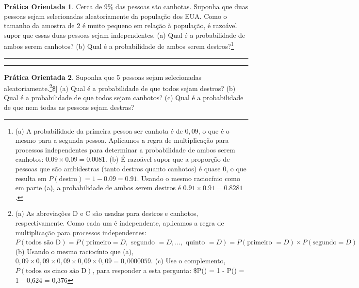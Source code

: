 \documentclass[
]{book}
\theoremstyle{definition}
\theoremstyle{definition}
\theoremstyle{definition}
\newtheorem{exercise}{Prática Orientada}[chapter]
\theoremstyle{definition}
\theoremstyle{remark}
\begin{document}
\begin{exercise}
\protect\hypertarget{exr:ex2Handedness}{}{\label{exr:ex2Handedness} }Cerca de 9\% das pessoas são canhotas. Suponha que duas pessoas sejam selecionadas aleatoriamente da população dos EUA. Como o tamanho da amostra de 2 é muito pequeno em relação à população, é razoável supor que essas duas pessoas sejam independentes. (a) Qual é a probabilidade de ambos serem canhotos? (b) Qual é a probabilidade de ambos serem destros?\footnote{(a) A probabilidade da primeira pessoa ser canhota é de \(0,09\), o que é o mesmo para a segunda pessoa. Aplicamos a regra de multiplicação para processos independentes para determinar a probabilidade de ambos serem canhotos: \(0.09 \times 0.09 = 0.0081\). (b) É razoável supor que a proporção de pessoas que são ambidestras (tanto destros quanto canhotos) é quase 0, o que resulta em \(P(\text{destro}) = 1 - 0.09 = 0.91\). Usando o mesmo raciocínio como em parte (a), a probabilidade de ambos serem destros é \(0.91 \times 0.91 = 0.8281\).}
\end{exercise}

\begin{center}\rule{0.5\linewidth}{0.5pt}\end{center}

\begin{center}\rule{0.5\linewidth}{0.5pt}\end{center}

\begin{exercise}
\protect\hypertarget{exr:ex5Handedness}{}{\label{exr:ex5Handedness} }
Suponha que 5 pessoas sejam selecionadas aleatoriamente.\footnote{(a) As abreviações D e C são usadas para destros e canhotos, respectivamente. Como cada um é independente, aplicamos a regra de multiplicação para processos independentes: \(P(\text{todos são D}) = P(\text{primeiro} = D, \text{ segundo } = D, \dots, \text{ quinto } = D) = P(\text{primeiro } = D)\times P(\text{segundo} = D)\times \dots \times P(\text{quinto }= D) = 0.91\times 0.91\times 0.91\times 0.91\times 0.91 = 0.624\) (b) Usando o mesmo raciocínio que (a), \(0,09\times 0,09\times 0,09\times 0,09\times 0,09 = 0,0000059\). (c) Use o complemento, \(P(\text{todos os cinco são D})\), para responder a esta pergunta: \$P() = 1 - P() = 1 -- 0,624 = 0,376}\${]}
(a) Qual é a probabilidade de que todos sejam destros?
(b) Qual é a probabilidade de que todos sejam canhotos?
(c) Qual é a probabilidade de que nem todas as pessoas sejam destras?
\end{exercise}
\end{document}
